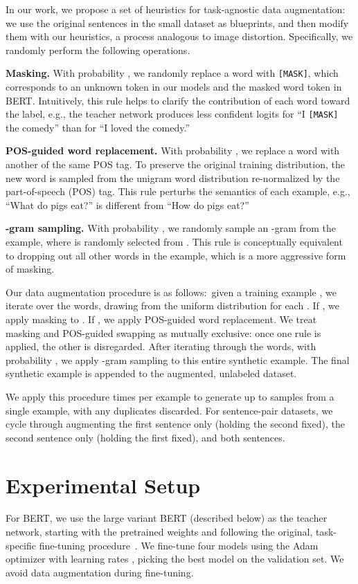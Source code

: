 \documentclass[11pt,a4paper]{article}
\newcommand{\parheader}[1]{{\smallskip \noindent \bf #1.}}
\begin{document}
In our work, we propose a set of heuristics for task-agnostic data augmentation: we use the original sentences in the small dataset as blueprints, and then modify them with our heuristics, a process analogous to image distortion. Specifically, we randomly perform the following operations.

\parheader{Masking}
With probability , we randomly replace a word with \texttt{[MASK]}, which corresponds to an unknown token in our models and the masked word token in BERT. Intuitively, this rule helps to clarify the contribution of each word toward the label, e.g., the teacher network produces less confident logits for ``I \texttt{[MASK]} the comedy'' than for ``I loved the comedy.''

\parheader{POS-guided word replacement}
With probability , we replace a word with another of the same POS tag. 
To preserve the original training distribution, the new word is sampled from the unigram word distribution re-normalized by the part-of-speech (POS) tag.
This rule perturbs the semantics of each example, e.g., ``What do pigs eat?'' is different from ``How do pigs eat?''

\parheader{-gram sampling}
With probability , we randomly sample an -gram from the example, where  is randomly selected from {}.
This rule is conceptually equivalent to dropping out all other words in the example, which is a more aggressive form of masking.

\smallskip 

Our data augmentation procedure is as follows:~given a training example , we iterate over the words, drawing from the uniform distribution  for each .
If , we apply masking to . 
If , we apply POS-guided word replacement. We treat masking and POS-guided swapping as mutually exclusive: once one rule is applied, the other is disregarded.
After iterating through the words, with probability , we apply -gram sampling to this entire synthetic example.
The final synthetic example is appended to the augmented, unlabeled dataset.

We apply this procedure  times per example to generate up to  samples from a single example, with any duplicates discarded. 
For sentence-pair datasets, we cycle through augmenting the first sentence only (holding the second fixed), the second sentence only (holding the first fixed), and both sentences.


\section{Experimental Setup}
For BERT, we use the large variant BERT (described below) as the teacher network, starting with the pretrained weights and following the original, task-specific fine-tuning procedure~\cite{devlin2018bert}.
We fine-tune four models using the Adam optimizer with learning rates , picking the best model on the validation set.
We avoid data augmentation during fine-tuning.
\end{document}
